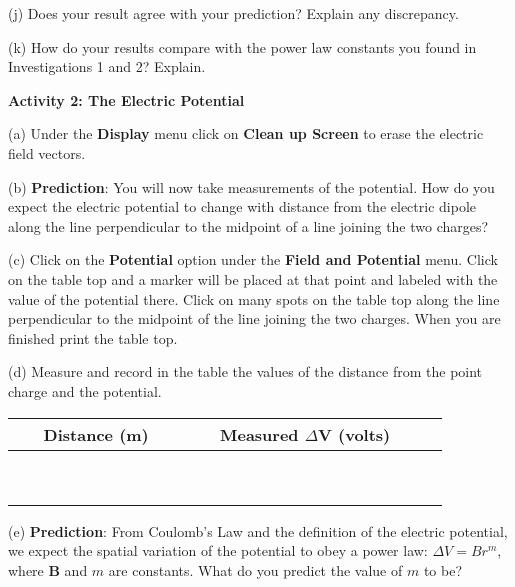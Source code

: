 (j) Does your result agree with your prediction? Explain any discrepancy.\vspace{15mm}

(k) How do your results compare with the power law constants you found
in Investigations 1 and 2? Explain.\vspace{15mm}


\textbf{Activity 2: The Electric Potential}

(a) Under the {\bf Display} menu click on {\bf Clean up Screen} to erase the
electric field vectors.

(b) \textbf{Prediction}: You will now take measurements of the potential.
How do you expect the electric potential to change with distance from the electric dipole
along the line perpendicular to the midpoint of a line joining the two charges?
\vspace{15mm}
 
(c) Click on the \textbf{Potential} option under the \textbf{Field and Potential}
menu. Click on the table top and a marker will be
placed at that point and labeled with the value of the potential there.
Click on many spots on the table top along the line perpendicular to the midpoint of the
line joining the two charges.
When you are finished print the table top.
\vspace{15mm}

(d) Measure and record in the table the values of the distance from the
point charge and the potential.

\vspace{0.3cm}
{\centering \begin{tabular}{|c|c|c|}
\hline 
~~~Distance (m)~~~&
~~~Measured \( \Delta  \)V (volts)~~~\\
\hline
\hline 
&
\\
\hline 
&
\\
\hline 
&
\\
\hline 
&
\\
\hline 
&
\\
\hline 
&
\\
\hline 
&
\\
\hline 
&
\\
\hline 
&
\\
\hline
\end{tabular}\par}
\vspace{0.3cm}


(e) \textbf{Prediction}: From Coulomb's Law and the definition of the
electric potential, we expect the spatial variation of the potential
to obey a power law: \( \Delta V=Br^{m} \), where \( \mathbf{B} \)
and \( m \) are constants. What do you predict the value of \textbf{\( m \)}
to be?\vspace{15mm}


